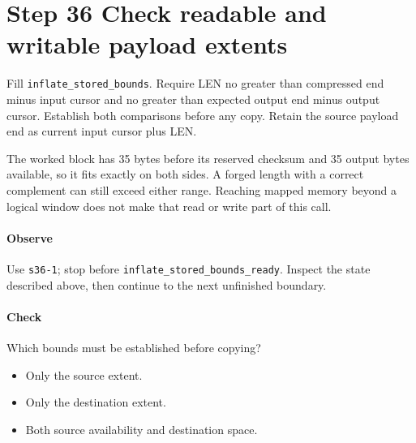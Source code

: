 \section{Step 36 Check readable and writable payload extents}\label{png-inflate-s36}
Fill \texttt{inflate\_stored\_bounds}. Require LEN no greater than compressed end minus input cursor and no greater than expected output end minus output cursor. Establish both comparisons before any copy. Retain the source payload end as current input cursor plus LEN.

The worked block has 35 bytes before its reserved checksum and 35 output bytes available, so it fits exactly on both sides. A forged length with a correct complement can still exceed either range. Reaching mapped memory beyond a logical window does not make that read or write part of this call.

\paragraph{Observe} Use \texttt{s36-1}; stop before \texttt{inflate\_stored\_bounds\_ready}. Inspect the state described above, then continue to the next unfinished boundary.

\paragraph{Check} Which bounds must be established before copying?
\begin{itemize}
  \item[A.] Only the source extent.
  \item[B.] Only the destination extent.
  \item[C.] Both source availability and destination space.
\end{itemize}

